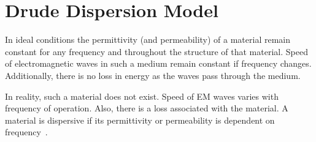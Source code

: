 \documentclass{article}
\begin{document}
\section{Drude Dispersion Model}

In ideal conditions the permittivity (and permeability) of a material remain constant for any frequency and throughout the structure of that material. Speed of electromagnetic waves in such a medium remain constant if frequency changes. Additionally, there is no loss in energy as the waves pass through the medium.

In reality, such a material does not exist. Speed of EM waves varies with frequency of operation. Also, there is a loss associated with the material. A material is dispersive if its permittivity or permeability is dependent on frequency~\cite[Ch. 10]{JBSchneiderUFDTD}.
\end{document}
